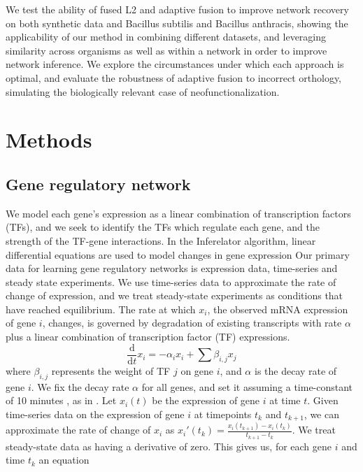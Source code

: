 \documentclass[11pt]{article}
\begin{document}
We test the ability of fused L2 and adaptive fusion to improve network recovery on both synthetic data and Bacillus subtilis and Bacillus anthracis, showing the applicability of our method in combining different datasets, and leveraging similarity across organisms as well as within a network in order to improve network inference. We explore the circumstances under which each approach is optimal, and evaluate the robustness of adaptive fusion to incorrect orthology, simulating the biologically relevant case of neofunctionalization. 

\section{Methods}
\subsection{Gene regulatory network}
We model each gene's expression as a linear combination of transcription factors (TFs), and we seek to identify the TFs which regulate each gene, and the strength of the TF-gene interactions. In the Inferelator algorithm, linear differential equations are used to model changes in gene expression \cite{bonneau_inferelator:_2006-1} Our primary data for learning gene regulatory networks is expression data, time-series and steady state experiments. We use time-series data to approximate the rate of change of expression, and we treat steady-state experiments as conditions that have reached equilibrium. The rate at which $x_{i}$, the observed mRNA expression of gene $i$, changes, is governed by degradation of existing transcripts with rate $\alpha$ plus a linear combination of transcription factor (TF) expressions. 
\begin{equation}
\frac{\mathrm d}{\mathrm d t} x_i = -\alpha_{i}x_{i} + \sum \beta_{i,j}x_{j}
\end{equation}
where $\beta_{i,j}$ represents the weight of TF $j$ on gene $i$, and $\alpha$ is the decay rate of gene $i$. We fix the decay rate $\alpha$ for all genes, and set it assuming a time-constant of 10 minutes \cite{hambraeus_genome-wide_2003, selinger_global_2003}, as in \cite{greenfield_robust_2013}. Let $x_i(t)$ be the expression of gene $i$ at time $t$. Given time-series data on the expression of gene $i$ at timepoints $t_k$ and $t_{k+1}$, we can approximate the rate of change of $x_i$ as $x_i'(t_k)=\frac{x_i(t_{k+1})-x_i(t_k)}{t_{k+1}-t_k}$. We treat steady-state data as having a derivative of zero. This gives us, for each gene $i$ and time $t_{k}$ an equation
\end{document}
